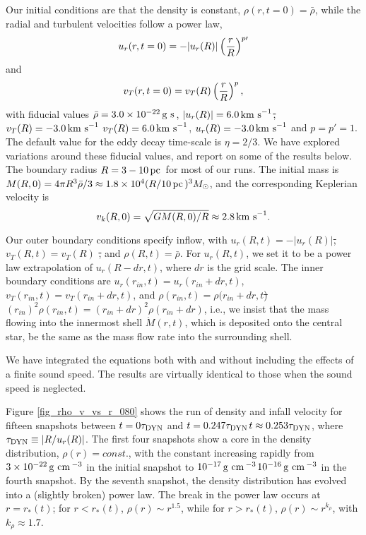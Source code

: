 \documentclass[iop,apj,numberedappendix]{emulateapj}
\newcommand       \phil[1]      {{\color{blue} #1}}
\newcommand       \be		{\begin{equation}}
\newcommand       \ee		{\end{equation}}
\newcommand       \pc		{\,{\rm pc \,}}
\newcommand       \cm		{\,{\rm cm \,}}
\newcommand       \s		{\,{\rm s \,}}
\newcommand       \g		{\,{\rm g \,}}
\newcommand       \kms          {\,{\rm km \,\, s}^{-1}}
\newcommand       \etaeff       {\eta}
\begin{document}
Our initial conditions are that the density is constant,
$\rho(r,t=0)=\bar\rho$, while the radial and turbulent velocities follow
a power law,
% 
\be  %
u_r(r,t=0)=-|u_r(R)|\left({r\over R}\right)^{p\prime}
\ee  %
%
and
% 
\be  %
v_T(r,t=0)=v_T(R)\left({r\over R}\right)^p,
\ee  %
%
with fiducial values $\bar\rho=3.0\times10^{-22}\g\s$,
\phil{\sout{$|u_r(R)|=6.0\kms$, $v_T(R)=-3.0\kms$} $v_T(R) = 6.0\kms$, $u_r(R)=-3.0\kms$} and $p=p'=1$.  The default value
for the eddy decay time-scale is $\etaeff=2/3$. We have explored
variations around these fiducial values, and report on some of the
results below. The boundary radius $R=3-10\pc$ for most of our
runs. The initial mass is $M(R,0)=4\pi R^3\bar\rho/3\approx
1.8\times10^4(R/10\pc)^3M_\odot$, and the corresponding Keplerian velocity is
%
\be  %
v_k(R,0)=\sqrt{GM(R,0)/R}\approx2.8\kms.
\ee  %
%

Our outer boundary conditions specify inflow, with
\phil{\sout{$u_r(R,t)=-|u_r(R)|$,}} $v_T(R,t)=v_T(R)$\phil{\sout{,}} and
$\rho(R,t)=\bar\rho$. \phil{For $u_r(R,t)$, we set it to be a power law extrapolation of $u_r(R-dr, t)$, where $dr$ is the grid scale.} The
inner boundary conditions are $u_r(r_{in},t)=u_r(r_{in}+dr,t)$,
$v_T(r_{in},t)=v_T(r_{in}+dr,t)$, and \phil{\sout{$\rho(r_{in},t)=\rho(r_{in}+dr,t$)} $(r_{in})^2\rho(r_{in}, t) = (r_{in}+dr)^2\rho(r_{in}+dr)$}, i.e., we insist that the mass flowing into the innermost shell
$\dot M(r,t)$,
which is deposited onto the central star, be the same as the mass flow
rate into the surrounding shell.

We have integrated the equations both with and without including the
effects of a finite sound speed. The results are virtually
identical to those when the sound speed is neglected.

Figure \ref{fig_rho_v_vs_r_080} shows the run of density and infall
velocity for fifteen snapshots between $t=0\tau_{\rm DYN}$ and
\phil{\sout{$t=0.247\tau_{\rm DYN}$}$t\approx 0.253\tau_{\rm DYN}$}, where $\tau_{\rm DYN}\equiv |R/u_r(R)|$. The
first four snapshots show a core in the density distribution,
$\rho(r)=const.$, with the constant increasing rapidly from
$3\times10^{-22}\g\cm^{-3}$ in the initial snapshot to
\phil{\sout{$10^{-17}\g\cm^{-3}$}$10^{-16}\g\cm^{-3}$} in the fourth snapshot. By the seventh snapshot, the
density distribution has evolved into a (slightly broken) power
law. The break in the power law occurs at $r=r_*(t)$; for $r<r_*(t)$,
$\rho(r)\sim r^{1.5}$, while for $r>r_*(t)$, $\rho(r)\sim r^{k_\rho}$,
with $k_\rho\approx1.7$.
\end{document}
